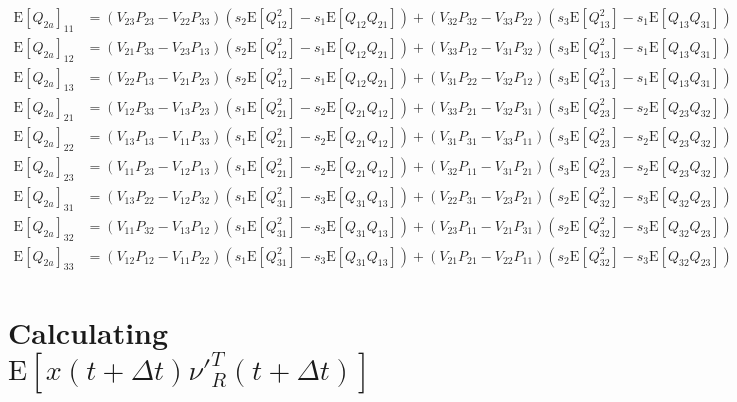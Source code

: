 \documentclass[10pt]{article}
\newcommand{\expect}[1]{\ensuremath{\mathrm{E}\left[ #1 \right]}}
\begin{document}
\begin{align*}
	\expect{Q_{2a}}_{11} &= (V_{23}P_{23}-V_{22}P_{33})(s_2\expect{Q_{12}^2}-s_1\expect{Q_{12}Q_{21}}) + (V_{32}P_{32}-V_{33}P_{22})(s_3\expect{Q_{13}^2}-s_1\expect{Q_{13}Q_{31}}) \\
	\expect{Q_{2a}}_{12} &= (V_{21}P_{33}-V_{23}P_{13})(s_2\expect{Q_{12}^2}-s_1\expect{Q_{12}Q_{21}}) + 
	(V_{33}P_{12}-V_{31}P_{32})(s_3\expect{Q_{13}^2}-s_1\expect{Q_{13}Q_{31}}) \\
	\expect{Q_{2a}}_{13} &= (V_{22}P_{13}-V_{21}P_{23})(s_2\expect{Q_{12}^2}-s_1\expect{Q_{12}Q_{21}}) + (V_{31}P_{22}-V_{32}P_{12})(s_3\expect{Q_{13}^2}-s_1\expect{Q_{13}Q_{31}}) \\
	\expect{Q_{2a}}_{21} &= (V_{12}P_{33}-V_{13}P_{23})(s_1\expect{Q_{21}^2}-s_2\expect{Q_{21}Q_{12}}) + (V_{33}P_{21}-V_{32}P_{31})(s_3\expect{Q_{23}^2}-s_2\expect{Q_{23}Q_{32}}) \\
	\expect{Q_{2a}}_{22} &= (V_{13}P_{13}-V_{11}P_{33})(s_1\expect{Q_{21}^2}-s_2\expect{Q_{21}Q_{12}}) + (V_{31}P_{31}-V_{33}P_{11})(s_3\expect{Q_{23}^2}-s_2\expect{Q_{23}Q_{32}}) \\
	\expect{Q_{2a}}_{23} &= (V_{11}P_{23}-V_{12}P_{13})(s_1\expect{Q_{21}^2}-s_2\expect{Q_{21}Q_{12}}) + (V_{32}P_{11}-V_{31}P_{21})(s_3\expect{Q_{23}^2}-s_2\expect{Q_{23}Q_{32}}) \\
	\expect{Q_{2a}}_{31} &= (V_{13}P_{22}-V_{12}P_{32})(s_1\expect{Q_{31}^2}-s_3\expect{Q_{31}Q_{13}}) + (V_{22}P_{31}-V_{23}P_{21})(s_2\expect{Q_{32}^2}-s_3\expect{Q_{32}Q_{23}}) \\
	\expect{Q_{2a}}_{32} &= (V_{11}P_{32}-V_{13}P_{12})(s_1\expect{Q_{31}^2}-s_3\expect{Q_{31}Q_{13}}) + (V_{23}P_{11}-V_{21}P_{31})(s_2\expect{Q_{32}^2}-s_3\expect{Q_{32}Q_{23}}) \\
	\expect{Q_{2a}}_{33} &= (V_{12}P_{12}-V_{11}P_{22})(s_1\expect{Q_{31}^2}-s_3\expect{Q_{31}Q_{13}}) + (V_{21}P_{21}-V_{22}P_{11})(s_2\expect{Q_{32}^2}-s_3\expect{Q_{32}Q_{23}})
\end{align*}

\section{Calculating $\expect{x(t+\Delta t)\nu'^T_R(t+\Delta t)}$}
\end{document}
